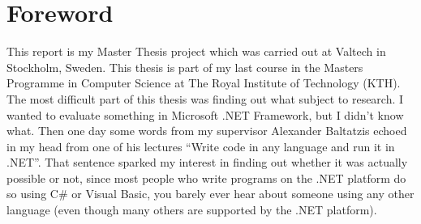\chapter*{Foreword}

This report is my Master Thesis project which was carried out at Valtech in Stockholm, Sweden. This thesis is part of my last course in the Masters Programme in Computer Science at The Royal Institute of Technology (KTH). The most difficult part of this thesis was finding out what subject to research. I wanted to evaluate something in Microsoft .NET Framework, but I didn't know what. Then one day some words from my supervisor Alexander Baltatzis echoed in my head from one of his lectures ``Write code in any language and run it in .NET''. That sentence sparked my interest in finding out whether it was actually possible or not, since most people who write programs on the .NET platform do so using C\# or Visual Basic, you barely ever hear about someone using any other language (even though many others are supported by the .NET platform). 